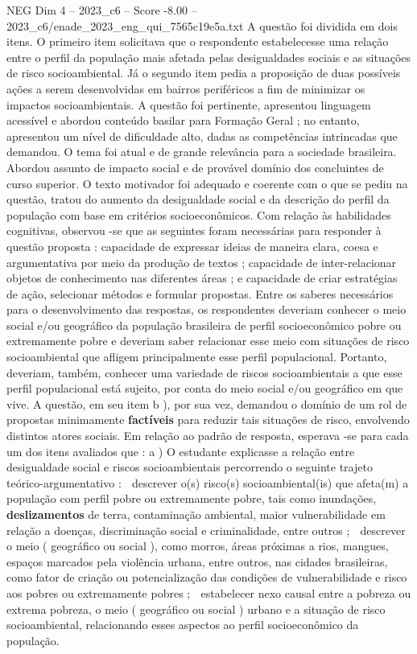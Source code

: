 \begin{textsample}{NEG Dim 4 – 2023\_c6 – Score -8.00 – 2023\_c6/enade\_2023\_eng\_qui\_7565c19e5a.txt}
A questão foi dividida em dois itens.
O primeiro item solicitava que o respondente estabelecesse uma relação entre o perfil da população mais afetada pelas desigualdades sociais e as situações de risco socioambiental.
Já o segundo item pedia a proposição de duas possíveis ações a serem desenvolvidas em bairros periféricos a fim de minimizar os impactos socioambientais.
A questão foi pertinente, apresentou linguagem acessível e abordou conteúdo basilar para Formação Geral ; no entanto, apresentou um nível de dificuldade alto, dadas as competências intrincadas que demandou.
O tema foi atual e de grande relevância para a sociedade brasileira.
Abordou assunto de impacto social e de provável domínio dos concluintes de curso superior.
O texto motivador foi adequado e coerente com o que se pediu na questão, tratou do aumento da desigualdade social e da descrição do perfil da população com base em critérios socioeconômicos.
Com relação às habilidades cognitivas, observou -se que as seguintes foram necessárias para responder à questão proposta : capacidade de expressar ideias de maneira clara, coesa e argumentativa por meio da produção de textos ; capacidade de inter-relacionar objetos de conhecimento nas diferentes áreas ; e capacidade de criar estratégias de ação, selecionar métodos e formular propostas.
Entre os saberes necessários para o desenvolvimento das respostas, os respondentes deveriam conhecer o meio social e/ou geográfico da população brasileira de perfil socioeconômico pobre ou extremamente pobre e deveriam saber relacionar esse meio com situações de risco socioambiental que afligem principalmente esse perfil populacional.
Portanto, deveriam, também, conhecer uma variedade de riscos socioambientais a que esse perfil populacional está sujeito, por conta do meio social e/ou geográfico em que vive.
A questão, em seu item b ), por sua vez, demandou o domínio de um rol de propostas minimamente \textbf{factíveis} para reduzir tais situações de risco, envolvendo distintos atores sociais.
Em relação ao padrão de resposta, esperava -se para cada um dos itens avaliados que : a ) O estudante explicasse a relação entre desigualdade social e riscos socioambientais percorrendo o seguinte trajeto teórico-argumentativo :  descrever o(s) risco(s) socioambiental(is) que afeta(m) a população com perfil pobre ou extremamente pobre, tais como inundações, \textbf{deslizamentos} de terra, contaminação ambiental, maior vulnerabilidade em relação a doenças, discriminação social e criminalidade, entre outros ;  descrever o meio ( geográfico ou social ), como morros, áreas próximas a rios, mangues, espaços marcados pela violência urbana, entre outros, nas cidades brasileiras, como fator de criação ou potencialização das condições de vulnerabilidade e risco aos pobres ou extremamente pobres ;  estabelecer nexo causal entre a pobreza ou extrema pobreza, o meio ( geográfico ou social ) urbano e a situação de risco socioambiental, relacionando esses aspectos ao perfil socioeconômico da população.

\end{textsample}
